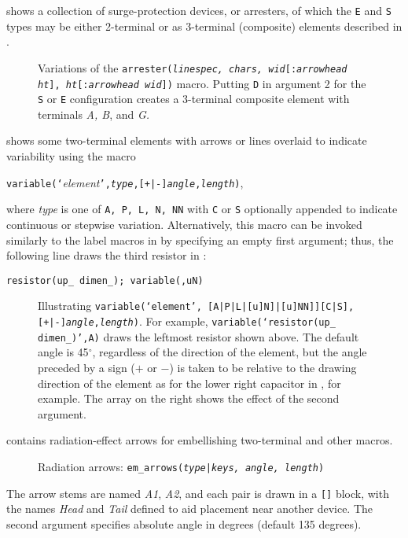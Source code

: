 \pagebreak
{} shows a collection of surge-protection devices, or arresters,
of which the {\tt E} and {\tt S} types may be either 2-terminal or as
3-terminal (composite) elements described in .
\begin{figure}[H]
   
   \caption{Variations of the {\tt arrester({\sl linespec, chars,}
     {\sl wid}[{\tt :}{\sl arrowhead ht}],
     {\sl ht}[{\tt :}{\sl arrowhead wid}])}
     macro. Putting {\tt D} in argument 2 for the {\tt S} or {\tt E}
     configuration creates a 3-terminal composite element
     with terminals {\sl A, B}, and {\sl G.}}
   \label{Arresters}
   \end{figure}

\enlargethispage{\baselineskip}
 shows some two-terminal elements with
arrows or lines overlaid to indicate variability using the macro
\par
{\tt variable(`}{\sl element}{\tt',{\sl type},[+|-]{\sl angle},{\sl length})},

\noindent
where {\sl type} is one of {\tt A, P, L, N, NN} with {\tt C} or {\tt S}
optionally appended to indicate continuous or stepwise variation.
Alternatively, this macro
can be invoked similarly to the label macros in
 by specifying an empty first argument;
thus, the following line draws the third resistor in :
\par
   {\tt resistor(up\_ dimen\_); variable(,uN)}

\begin{figure}[H]
\vspace*{-\baselineskip}
   
   \caption{Illustrating
{\tt variable(`{\sl element}',%
[A|P|L|[u]N]|[u]NN]][C|S],[+|-]{\sl angle},{\sl length})}.
   For example, {\tt variable(`resistor(up\_ dimen\_)',A)} draws
   the leftmost resistor shown above.
   The default angle is 45${}^{\circ}$, regardless of the direction of
   the element, but the angle preceded by a sign ($+$ or $-$) is taken
   to be relative to the drawing direction of the element as for the
   lower right capacitor in , for example.  The array on
   the right shows the effect of the second argument.}
   \label{Variable}
   \end{figure}

 contains radiation-effect arrows for embellishing two-terminal
and other macros.
\begin{figure}[H]
   
   \caption{Radiation arrows: {\tt em\_arrows({\sl type}|{\sl keys,%
     angle, length})}}
   \label{Emarrows}
   \end{figure}
The arrow stems are named {\sl A1}, {\sl A2},
and each pair is drawn in a \verb|[]| block, with
the names {\sl Head} and {\sl Tail} defined to
aid placement near another device.  The second argument specifies
absolute angle in degrees (default 135 degrees).

